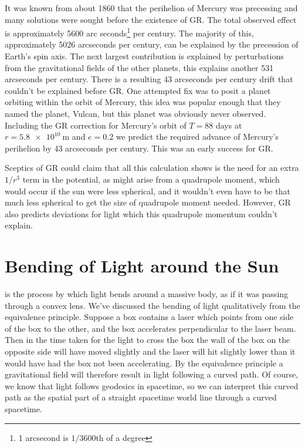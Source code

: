 \documentclass[fleqn]{NotesClass}
\begin{document}
    It was known from about 1860 that the perihelion of Mercury was precessing and many solutions were sought before the existence of GR.
    The total observed effect is approximately \num{5600} arc seconds\footnote{1 arcsecond is \(1/3600\)th of a degree} per century.
    The majority of this, approximately 5026 arcseconds per century, can be explained by the precession of Earth's spin axis.
    The next largest contribution is explained by perturbations from the gravitational fields of the other planets, this explains another 531 arcseconds per century.
    There is a resulting 43 arcseconds per century drift that couldn't be explained before GR.
    One attempted fix was to posit a planet orbiting within the orbit of Mercury, this idea was popular enough that they named the planet, Vulcan, but this planet was obviously never observed.
    Including the GR correction for Mercury's orbit of \(T = 88\) days at \(r = \qty{5.8e10}{\metre}\) and \(e = 0.2\) we predict the required advance of Mercury's perihelion by 43 arcseconds per century.
    This was an early success for GR.
    
    Sceptics of GR could claim that all this calculation shows is the need for an extra \(1/r^3\) term in the potential, as might arise from a quadrupole moment, which would occur if the sun were less spherical, and it wouldn't even have to be that much less spherical to get the size of quadrupole moment needed.
    However, GR also predicts deviations for light which this quadrupole momentum couldn't explain.
    
    \section{Bending of Light around the Sun}
     is the process by which light bends around a massive body, as if it was passing through a convex lens.
    We've discussed the bending of light qualitatively from the equivalence principle.
    Suppose a box contains a laser which points from one side of the box to the other, and the box accelerates perpendicular to the laser beam.
    Then in the time taken for the light to cross the box the wall of the box on the opposite side will have moved slightly and the laser will hit slightly lower than it would have had the box not been accelerating.
    By the equivalence principle a gravitational field will therefore result in light following a curved path.
    Of course, we know that light follows geodesics in spacetime, so we can interpret this curved path as the spatial part of a straight spacetime world line through a curved spacetime.
    
\end{document}

